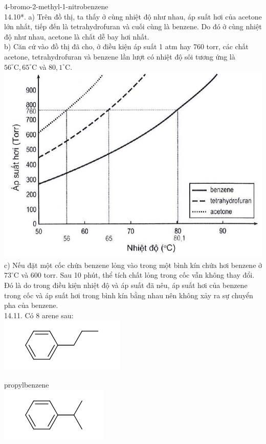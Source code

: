 \documentclass[10pt]{article}
\begin{document}
4-bromo-2-methyl-1-nitrobenzene\\
14.10*. a) Trên đồ thị, ta thấy ở cùng nhiệt độ như nhau, áp suất hơi của acetone lớn nhất, tiếp đến là tetrahydrofuran và cuối cùng là benzene. Do đó ở cùng nhiệt độ như nhau, acetone là chất dễ bay hơi nhất.\\
b) Căn cứ vào đồ thị đã cho, ở điều kiện áp suất 1 atm hay 760 torr, các chất acetone, tetrahydrofuran và benzene lần lượt có nhiệt độ sôi tương ứng là $56^{\circ} \mathrm{C}, 65^{\circ} \mathrm{C}$ và $80,1^{\circ} \mathrm{C}$.\\
\includegraphics[max width=\textwidth, center]{2025_10_23_adad5b98d65ac6665838g-25}\\
c) Nếu đặt một cốc chứa benzene lỏng vào trong một bình kín chứa hơi benzene ở $73^{\circ} \mathrm{C}$ và 600 torr. Sau 10 phút, thể tích chất lỏng trong cốc vẫn không thay đổi. Đó là do trong điều kiện nhiệt độ và áp suất đã nêu, áp suất hơi của benzene trong cốc và áp suất hơi trong bình kín bằng nhau nên không xảy ra sự chuyển pha của benzene.\\
14.11. Có 8 arene sau:\\
\includegraphics{smile-ba8af16fe8ebec3397da9552da37adc3e0ae54c8}

propylbenzene\\
\includegraphics{smile-6144f280c1b20172d0894b2293004c25ccf30891}
\end{document}
